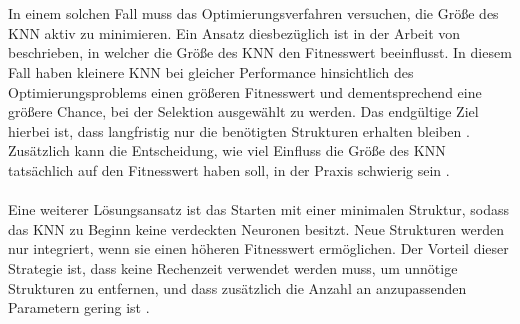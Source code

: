 \\\\
In einem solchen Fall muss das Optimierungsverfahren versuchen, die Größe des \ac{KNN} aktiv zu minimieren. Ein Ansatz diesbezüglich ist in der Arbeit von \citeauthor{zhang1993evolving} beschrieben, in welcher die Größe des \ac{KNN} den Fitnesswert beeinflusst. In diesem Fall haben kleinere \ac{KNN} bei gleicher Performance hinsichtlich des Optimierungsproblems einen größeren Fitnesswert und dementsprechend eine größere Chance, bei der Selektion ausgewählt zu werden. Das endgültige Ziel hierbei ist, dass langfristig nur die benötigten Strukturen erhalten bleiben \cite{zhang1993evolving}. Zusätzlich kann die Entscheidung, wie viel Einfluss die Größe des \ac{KNN} tatsächlich auf den Fitnesswert haben soll, in der Praxis schwierig sein \cite{stanley2002evolving}.
\\\\
Eine weiterer Lösungsansatz ist das Starten mit einer minimalen Struktur, sodass das \ac{KNN} zu Beginn keine verdeckten Neuronen besitzt. Neue Strukturen werden nur integriert, wenn sie einen höheren Fitnesswert ermöglichen. Der Vorteil dieser Strategie ist, dass keine Rechenzeit verwendet werden muss, um unnötige Strukturen zu entfernen, und dass zusätzlich die Anzahl an anzupassenden Parametern gering ist \cite{stanley2002evolving}.


